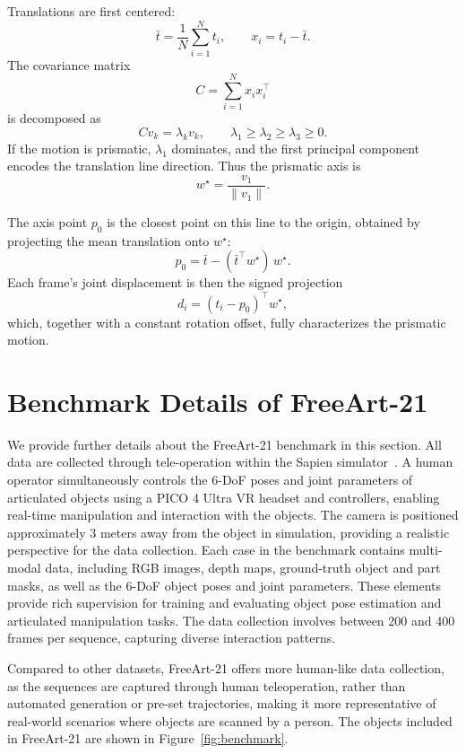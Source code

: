 Translations are first centered:
\[
    \bar t = \frac{1}{N}\sum_{i=1}^N t_i,
    \qquad
    x_i = t_i - \bar t.
\]
The covariance matrix
\[
    C = \sum_{i=1}^N x_i x_i^\top
\]
is decomposed as
\[
    C v_k = \lambda_k v_k,
    \qquad
    \lambda_1 \ge \lambda_2 \ge \lambda_3 \ge 0.
\]
If the motion is prismatic, $\lambda_1$ dominates, and the first principal component encodes the translation line direction.  
Thus the prismatic axis is
\[
    w^\star = \frac{v_1}{\|v_1\|}.
\]

The axis point $p_0$ is the closest point on this line to the origin, obtained by projecting the mean translation onto $w^\star$:
\[
    p_0 
    = \bar t - (\bar t^\top w^\star)\, w^\star.
\]
Each frame’s joint displacement is then the signed projection
\[
    d_i = (t_i - p_0)^\top w^\star,
\]
which, together with a constant rotation offset, fully characterizes the prismatic motion.



\section{Benchmark Details of FreeArt-21}

We provide further details about the FreeArt-21 benchmark in this section. All data are collected through tele-operation within the Sapien simulator~\cite{partnetmobility}. A human operator simultaneously controls the 6-DoF poses and joint parameters of articulated objects using a PICO 4 Ultra VR headset and controllers, enabling real-time manipulation and interaction with the objects. The camera is positioned approximately 3 meters away from the object in simulation, providing a realistic perspective for the data collection. Each case in the benchmark contains multi-modal data, including RGB images, depth maps, ground-truth object and part masks, as well as the 6-DoF object poses and joint parameters. These elements provide rich supervision for training and evaluating object pose estimation and articulated manipulation tasks. The data collection involves between 200 and 400 frames per sequence, capturing diverse interaction patterns. 

Compared to other datasets, FreeArt-21 offers more human-like data collection, as the sequences are captured through human teleoperation, rather than automated generation or pre-set trajectories, making it more representative of real-world scenarios where objects are scanned by a person. The objects included in FreeArt-21 are shown in Figure~\ref{fig:benchmark}.

